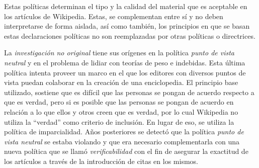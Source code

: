 Estas pol\'iticas determinan el tipo y la calidad del material que es aceptable en los art\'iculos de Wikipedia. Estas, se complementan entre s\'i y no deben interpretarse de forma aislada, as\'i como tambi\'en, los principios en que se basan estas declaraciones pol\'iticas no son reemplazadas por otras pol\'iticas o directrices.

La \emph{investigaci\'on no original} tiene sus or\'igenes en la pol\'itica \emph{punto de vista neutral} y en el problema de lidiar con teor\'ias de peso e indebidas. Esta \'ultima pol\'itica intenta proveer un marco en el que los editores con diversos puntos de vista puedan colaborar en la creaci\'on de una enciclopedia. El principio base utilizado, sostiene que es dif\'icil que las personas se pongan de acuerdo respecto a que es verdad, pero si es posible que las personas se pongan de acuerdo en relaci\'on a lo que ellos y otros creen que es verdad, por lo cual Wikipedia no utiliza la ``verdad'' como criterio de inclusi\'on. En lugar de eso, se utiliza la pol\'itica de imparcialidad.
A\~nos posteriores se detect\'o que la pol\'itica \emph{punto de vista neutral} se estaba violando y que era necesario complementarla con una nueva pol\'itica que se llam\'o \emph{verificabilidad} con el fin de asegurar la exactitud de los art\'iculos a trav\'es de la introducci\'on de citas en los mismos. 
